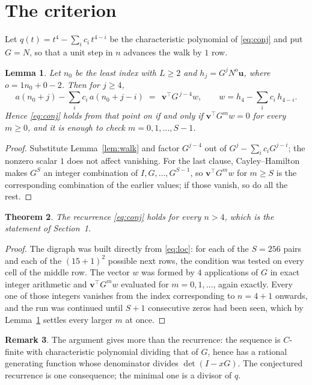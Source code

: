 \documentclass[11pt,a4paper]{article}
\theoremstyle{plain}
\newtheorem{theorem}{Theorem}
\newtheorem{lemma}[theorem]{Lemma}
\theoremstyle{definition}
\newtheorem{remark}[theorem]{Remark}
\begin{document}
\section{The criterion}

Let $q(t)=t^{4}-\sum_i c_i\,t^{4-i}$ be the characteristic polynomial of
\eqref{eq:conj} and put $G=N$, so that a unit step in $n$ advances the walk by
$1$ row.

\begin{lemma}\label{lem:crit}
Let $n_0$ be the least index with $L\ge2$ and $h_j=G^{j}N^{o}\mathbf{u}$, where
$o=1n_0+0-2$. Then for $j\ge4$,
\[
a(n_0+j)-\sum_i c_i\,a(n_0+j-i)\;=\;\,\mathbf{v}^{\!\top}G^{\,j-4}w,
\qquad w=h_{4}-\sum_i c_i\,h_{4-i} .
\]
Hence \eqref{eq:conj} holds from that point on if and only if
$\mathbf{v}^{\!\top}G^{m}w=0$ for every $m\ge0$, and it is enough to check
$m=0,1,\dots,S-1$.
\end{lemma}

\begin{proof}
Substitute Lemma~\ref{lem:walk} and factor $G^{j-4}$ out of
$G^{j}-\sum_ic_iG^{j-i}$; the nonzero scalar $1$ does not affect
vanishing. For the last clause, Cayley--Hamilton makes $G^{S}$ an integer combination of
$I,G,\dots,G^{S-1}$, so $\mathbf{v}^{\!\top}G^{m}w$ for $m\ge S$ is the corresponding
combination of the earlier values; if those vanish, so do all the rest.
\end{proof}

\begin{theorem}
The recurrence \eqref{eq:conj} holds for every $n>4$, which is the statement of
Section~1.
\end{theorem}

\begin{proof}
The digraph was built directly from \eqref{eq:loc}: for each of the $S=256$ pairs and each
of the $(15+1)^{2}$ possible next rows, the condition was tested on every cell of
the middle row. The vector $w$ was formed by $4$ applications of $G$ in exact integer
arithmetic and $\mathbf{v}^{\!\top}G^{m}w$ evaluated for $m=0,1,\dots$, again exactly.
Every one of those integers vanishes from the index corresponding to $n=4+1$ onwards,
and the run was continued until $S+1$ consecutive zeros had been seen, which by
Lemma~\ref{lem:crit} settles every larger $m$ at once.
\end{proof}

\begin{remark}
The argument gives more than the recurrence: the sequence is $C$-finite with characteristic
polynomial dividing that of $G$, hence has a rational generating function whose denominator
divides $\det(I-xG)$. The conjectured recurrence is one consequence; the minimal one is a
divisor of $q$.
\end{remark}
\end{document}
